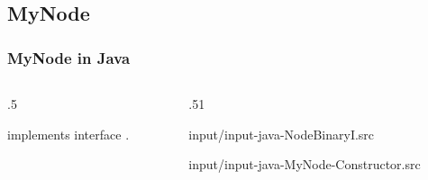 \documentclass[10pt]{beamer}
\begin{document}
\subsection{MyNode}
\begin{frame}[t]\frametitle{MyNode in Java}
	\vspace{-0.3cm}
	\begin{columns}[T] %
	\begin{column}{.5\linewidth} %
		{\tiny 
		\begin{algorithm}[H]
		\end{algorithm}
		} %

		\vspace{1cm}
		{\footnotesize 
			  implements interface .
		} %
	\end{column} %
	\begin{column}{.51\linewidth} %
		{\tiny 
			
				{input/input-java-NodeBinaryI.src}
		} %
		{\tiny 
			
				{input/input-java-MyNode-Constructor.src}
		} %
	\end{column} %
	\end{columns} %

\end{frame}
\end{document}
